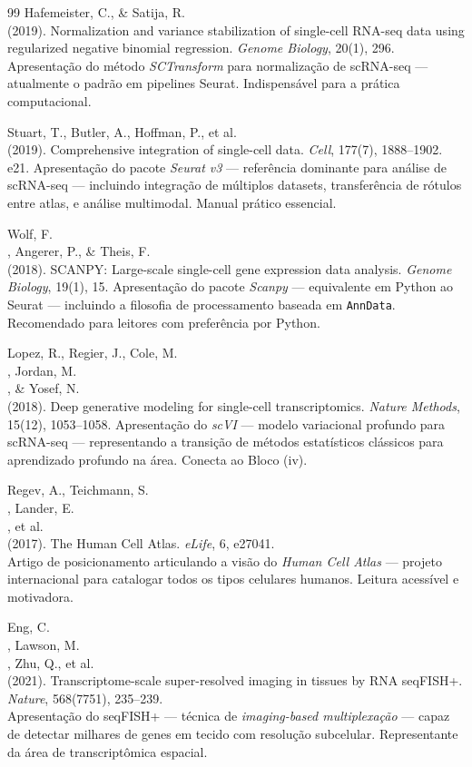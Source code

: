 \begin{thebibliography}{99}
 Hafemeister, C., \& Satija, R.\\ (2019). Normalization and variance stabilization of single-cell RNA-seq data using regularized negative binomial regression. \emph{Genome Biology}, 20(1), 296. Apresentação do método \emph{SCTransform} para normalização de scRNA-seq --- atualmente o padrão em pipelines Seurat. Indispensável para a prática computacional.

 Stuart, T., Butler, A., Hoffman, P., et al.\\ (2019). Comprehensive integration of single-cell data. \emph{Cell}, 177(7), 1888--1902.\\ e21. Apresentação do pacote \emph{Seurat v3} --- referência dominante para análise de scRNA-seq --- incluindo integração de múltiplos datasets, transferência de rótulos entre atlas, e análise multimodal. Manual prático essencial.

 Wolf, F.\\, Angerer, P., \& Theis, F.\\ (2018). SCANPY: Large-scale single-cell gene expression data analysis. \emph{Genome Biology}, 19(1), 15. Apresentação do pacote \emph{Scanpy} --- equivalente em Python ao Seurat --- incluindo a filosofia de processamento baseada em \texttt{AnnData}. Recomendado para leitores com preferência por Python.

 Lopez, R., Regier, J., Cole, M.\\, Jordan, M.\\, \& Yosef, N.\\ (2018). Deep generative modeling for single-cell transcriptomics. \emph{Nature Methods}, 15(12), 1053--1058. Apresentação do \emph{scVI} --- modelo variacional profundo para scRNA-seq --- representando a transição de métodos estatísticos clássicos para aprendizado profundo na área. Conecta ao Bloco (iv).

 Regev, A., Teichmann, S.\\, Lander, E.\\, et al.\\ (2017). The Human Cell Atlas. \emph{eLife}, 6, e27041.\\ Artigo de posicionamento articulando a visão do \emph{Human Cell Atlas} --- projeto internacional para catalogar todos os tipos celulares humanos. Leitura acessível e motivadora.

 Eng, C.\\, Lawson, M.\\, Zhu, Q., et al.\\ (2021). Transcriptome-scale super-resolved imaging in tissues by RNA seqFISH+. \emph{Nature}, 568(7751), 235--239.\\ Apresentação do seqFISH+ --- técnica de \emph{imaging-based multiplexação} --- capaz de detectar milhares de genes em tecido com resolução subcelular. Representante da área de transcriptômica espacial.


\end{thebibliography}

